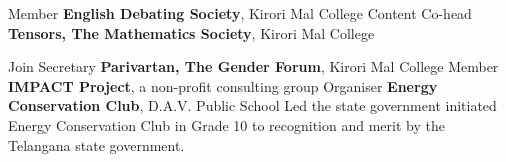 {Member}
{\textbf{English Debating Society}, Kirori Mal College}
{}
%
%
{Content Co-head}
{\textbf{Tensors, The Mathematics Society}, Kirori Mal College}
{
}

{Join Secretary}
{\textbf{Parivartan, The Gender Forum}, Kirori Mal College}
{
}
{Member}
{\textbf{IMPACT Project}, a non-profit consulting group}
{ }
{Organiser}
{\textbf{Energy Conservation Club}, D.A.V. Public School}
{
    Led the state government initiated Energy Conservation Club
    in Grade 10 to recognition and merit by the Telangana state
    government.
}